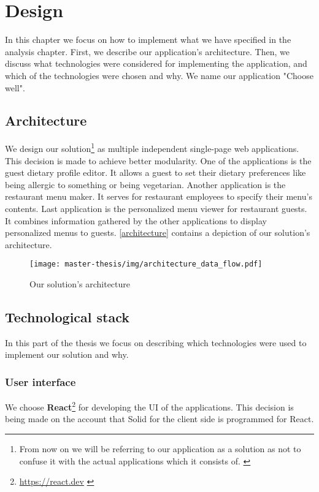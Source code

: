 \chapter{Design}
In this chapter we focus on how to implement what we have specified in the analysis chapter.
First, we describe our application's architecture.
Then, we discuss what technologies were considered for implementing the application, and which of the technologies were chosen and why.
We name our application "Choose well".

\section{Architecture}
We design our solution\footnote{From now on we will be referring to our application as a solution as not to  confuse it with the actual applications which it consists of.  \label{fnlabel}} as multiple independent single-page web applications.
This decision is made to achieve better modularity. 
One of the applications is the guest dietary profile editor.
It allows a guest to set their dietary preferences like being allergic to something or being vegetarian.
Another application is the restaurant menu maker.
It serves for restaurant employees to specify their menu's contents.
Last application is the personalized menu viewer for restaurant guests.
It combines information gathered by the other applications to display personalized menus to guests. 
\autoref{architecture} contains a depiction of our solution's architecture.

\begin{figure}[h]
  \centering
  \texttt{[image: master-thesis/img/architecture\_data\_flow.pdf]}
  \caption{Our solution's architecture} \label{architecture}
\end{figure}

\section{Technological stack}
In this part of the thesis we focus on describing which technologies were used to implement our solution and why.

\subsection*{User interface}
We choose \textbf{React}\footnote{\url{https://react.dev}  \label{fnlabel}} for developing the UI of the applications.
This decision is being made on the account that Solid for the client side is programmed for React.

